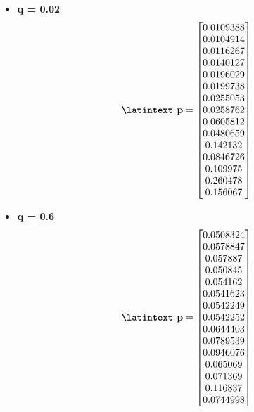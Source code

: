 \documentclass{article}
\newcommand{\lt}{\latintext}
\begin{document}
\begin{itemize}
    \item \textbf{\lt q = 0.02}
    \begin{equation*}
        \textbf{\lt p} = 
        \begin{bmatrix}
            0.0109388\\   
            0.0104914\\   
            0.0116267\\   
            0.0140127\\   
            0.0196029\\   
            0.0199738\\   
            0.0255053\\   
            0.0258762\\   
            0.0605812\\   
            0.0480659\\   
            0.142132\\   
            0.0846726\\   
            0.109975\\   
            0.260478\\   
            0.156067
        \end{bmatrix}
    \end{equation*}
    \item \textbf{\lt q = 0.6}
    \begin{equation*}
        \textbf{\lt p} = 
        \begin{bmatrix}
            0.0508324\\   
            0.0578847\\   
            0.057887\\   
            0.050845\\   
            0.054162\\  
            0.0541623\\   
            0.0542249\\   
            0.0542252\\   
            0.0644403\\   
            0.0789539\\   
            0.0946076\\   
            0.065069\\   
            0.071369\\   
            0.116837\\   
            0.0744998
        \end{bmatrix}
    \end{equation*}\\
\end{itemize}
\end{document}
